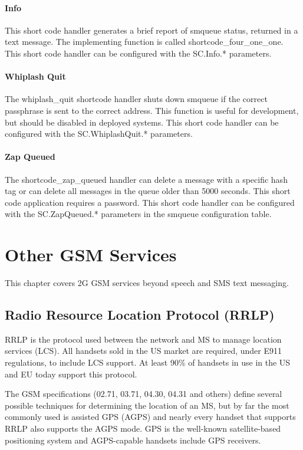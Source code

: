\documentclass[11pt,openany]{book}
\begin{document}
\subsubsection{Info}
This short code handler generates a brief report of smqueue status, returned in a text message.  The implementing function is called shortcode\_four\_one\_one. This short code handler can be configured with the  SC.Info.* parameters.
\subsubsection{Whiplash Quit}
The whiplash\_quit shortcode handler shuts down smqueue if the correct passphrase is sent to the correct address.  This function is useful for development, but should be disabled in deployed systems.   This short code handler can be configured with the  SC.WhiplashQuit.* parameters.

\subsubsection{Zap Queued}
The shortcode\_zap\_queued handler can delete a message with a specific hash tag or can delete all messages in the queue older than 5000 seconds.  This short code application requires a password.  This short code handler can be configured with the  SC.ZapQueued.* parameters in the smqueue configuration table.














\chapter{Other GSM Services}
\label{chap:otherServices}
This chapter covers 2G GSM services beyond speech and SMS text messaging.


\section{Radio Resource Location Protocol (RRLP)}
RRLP is the protocol used between the network and MS to manage location services (LCS).
All handsets sold in the US market are required, under E911 regulations, to include LCS support.
At least 90\% of handsets in use in the US and EU today support this protocol.

The GSM specifications (02.71, 03.71, 04.30, 04.31 and others) define several possible techniques for determining the location of an MS, but by far the most commonly used is assisted GPS (AGPS) and nearly every handset that supports RRLP also supports the AGPS mode.
GPS is the well-known satellite-based positioning system and AGPS-capable handsets include GPS receivers.
\end{document}

